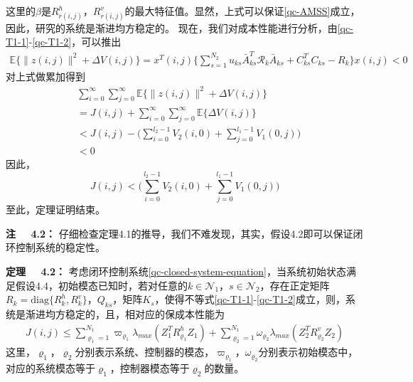 	这里的$\beta$是$R^{h}_{r(i,j)}$，$R^{v}_{r(i,j)}$的最大特征值。显然，上式可以保证\eqref{qc-AMSS}成立，因此，研究的系统是渐进均方稳定的。
	现在，我们对成本性能进行分析，由\eqref{qc-T1-1}-\eqref{qc-T1-2}，可以推出
	\begin{equation}
		\begin{split}
			\mathbb{E}\{\|z(i,j)\|^{2}+\varDelta V(i,j) \}=x^{T}(i,j)\{\sum_{s=1}^{N_2}u_{ks} \bar{A}^{T}_{ks}\mathcal{R}_{k}\bar{A}_{ks} +C^{T}_{ks}C_{ks}-R_{k} \}x(i,j)<0
		\end{split}
	\end{equation}
	对上式做累加得到
	\begin{equation}
	\begin{split}
	&\sum_{i=0}^{\infty}\sum_{j=0}^{\infty}\mathbb{E}\{\|z(i,j)\|^{2}+\varDelta V(i,j) \}\\&=J(i,j)+\sum_{i=0}^{\infty}\sum_{j=0}^{\infty}\mathbb{E}\{\varDelta V(i,j) \}\\
	&<J(i,j)-\big( \sum_{i=0}^{l_2-1}V_2(i,0) + \sum_{j=0}^{l_1-1}V_{1}(0,j)\big)\\&<0
	\end{split}
	\end{equation}
	因此，
	\begin{equation}
		J(i,j)<\big( \sum_{i=0}^{l_2-1}V_2(i,0) + \sum_{j=0}^{l_1-1}V_{1}(0,j)\big)
	\end{equation}
	至此，定理证明结束。
	
	{\bf 注 \ \ 4.2：}
	仔细检查定理4.1的推导，我们不难发现，其实，假设4.2即可以保证闭环控制系统的稳定性。


	{\bf 定理 \ \ 4.2：}
	考虑闭环控制系统\eqref{qc-closed-system-equation}，当系统初始状态满足假设4.4，初始模态已知时，若对任意的$k\in\mathcal{N}_{1}$，$s\in\mathcal{N}_2$，存在正定矩阵$R_{k}=\mathrm{diag}\{R^{h}_{k},R^{v}_{k}\}$，$Q_{ks}$，矩阵$K_{s}$，使得不等式\eqref{qc-T1-1}-\eqref{qc-T1-2}成立，则，系统是渐进均方稳定的，且，相对应的保成本性能为
	\begin{equation}\label{qcT2}
	\begin{split}
	J(i,j) \leq \sum_{\varrho_{1}=1}^{N_{1}}\varpi_{\varrho_{1}}\lambda_{max}(Z^{T}_{1}R^{h}_{\varrho_{1}}Z_{1})
	+\sum_{\varrho_{2}=1}^{N_{1}}\omega_{\varrho_{2}}\lambda_{max}(Z^{T}_{2}R^{v}_{\varrho_{2}}Z_{2})
	\end{split}
	\end{equation}
	这里，$\varrho_{1}$，$\varrho_{2}$分别表示系统、控制器的模态，$\varpi_{\varrho_{1}}$，$\omega_{\varrho_{2}}$分别表示初始模态中，对应的系统模态等于$\varrho_{1}$，控制器模态等于$\varrho_{2}$的数量。
	
